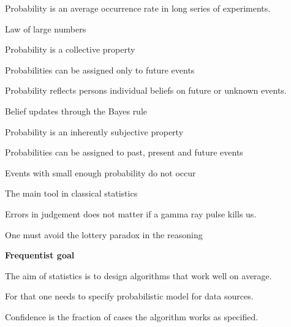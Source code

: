 \documentclass[landscape,footrule]{foils}
\begin{document}



Probability is an average occurrence rate in long series of experiments.

\begin{triangles}
\item Law of large numbers
\item Probability is a collective property 
\item Probabilities can be assigned only to future events
\end{triangles}





Probability reflects persons individual beliefs on future or unknown events. 

\begin{triangles}
\item Belief updates through the Bayes rule
\item Probability is an inherently subjective property 
\item Probabilities can be assigned  to past, present and future events
\end{triangles}





Events with small enough probability do not occur
\begin{triangles}
\item The main tool in classical statistics 
\item Errors in judgement does not matter if a gamma ray pulse kills us.
\item One must avoid the lottery paradox in the reasoning
\end{triangles}



\textbf{Frequentist goal}
\begin{triangles}
\item The aim of statistics is to design algorithms that work well on average.
\item For that one needs to specify probabilistic model for data sources.
\item Confidence is the fraction of cases the algorithm works as specified.
\end{triangles}
\vspace*{2cm}
\end{document}
